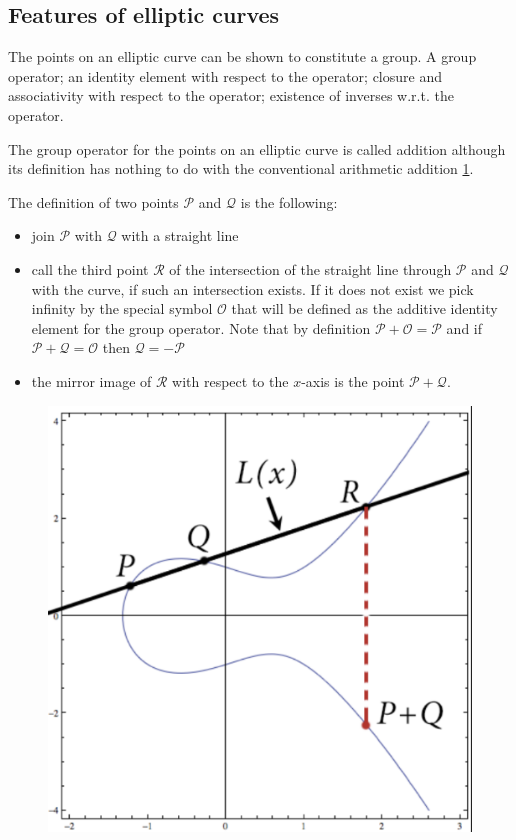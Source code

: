 \subsection{Features of elliptic curves}
The points on an elliptic curve can be shown to constitute a group. A group operator; an identity element with respect to the operator; closure and associativity with respect to the operator; existence of inverses w.r.t. the operator.

The group operator for the points on an elliptic curve is called addition although its definition has nothing to do with the conventional arithmetic addition \ref{fig:eccaddition}.

The definition of two points $\mathcal{P}$ and $\mathcal{Q}$ is the following:
\begin{itemize}
	\item join $\mathcal{P}$ with $\mathcal{Q}$ with a straight line
	\item call the third point $\mathcal{R}$ of the intersection of the straight line through $\mathcal{P}$ and $\mathcal{Q}$ with the curve, if such an intersection exists. If it does not exist we pick infinity by the special symbol $\mathcal{O}$ that will be defined as the additive identity element for the group operator. Note that by definition $\mathcal{P}+\mathcal{O} = \mathcal{P}$ and if $\mathcal{P}+\mathcal{Q}=\mathcal{O}$ then $\mathcal{Q} = -\mathcal{P}$
	\item the mirror image of $\mathcal{R}$ with respect to the $x$-axis is the point $\mathcal{P} + \mathcal{Q}$.
\end{itemize}



\begin{figure}
	\centering
	\includegraphics[width=0.5\linewidth]{Images/Chapter5/ecc_addition}
	\caption{}
	\label{fig:eccaddition}
\end{figure}

